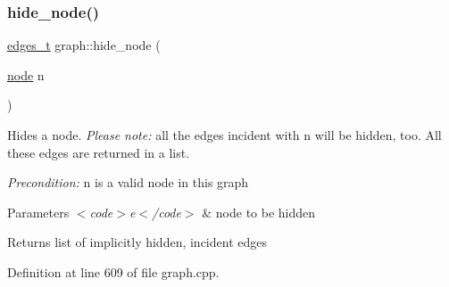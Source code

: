 \subsubsection{\texorpdfstring{hide\+\_\+node()}{hide\_node()}}
{\footnotesize\ttfamily \mbox{\hyperlink{edge_8h_a8f9587479bda6cf612c103494b3858e3}{edges\+\_\+t}} graph\+::hide\+\_\+node (\begin{DoxyParamCaption}\item[{\mbox{\hyperlink{classnode}{node}}}]{n }\end{DoxyParamCaption})\hspace{0.3cm}{\ttfamily [inherited]}}

Hides a node. {\itshape Please note\+:} all the edges incident with {\ttfamily n} will be hidden, too. All these edges are returned in a list.

{\itshape Precondition\+:} {\ttfamily n} is a valid node in this graph


\begin{DoxyParams}{Parameters}
{\em $<$code$>$e$<$/code$>$} & node to be hidden \\
\hline
\end{DoxyParams}
\begin{DoxyReturn}{Returns}
list of implicitly hidden, incident edges 
\end{DoxyReturn}


Definition at line 609 of file graph.\+cpp.


